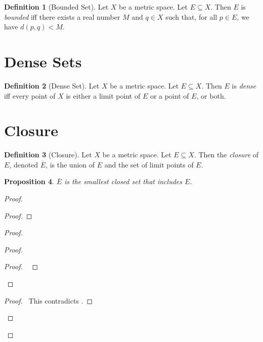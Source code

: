 \documentclass{book}
\let\qed\relax
\newtheorem{prop}{Proposition}[chapter]
\theoremstyle{definition}
\newtheorem{df}[prop]{Definition}
\begin{document}
\begin{df}[Bounded Set]
Let $X$ be a metric space. Let $E \subseteq X$. Then $E$ is \emph{bounded} iff there exists a real number $M$ and $q \in X$ such that, for all $p \in E$, we have $d(p,q) < M$.
\end{df}

\section{Dense Sets}

\begin{df}[Dense Set]
Let $X$ be a metric space. Let $E \subseteq X$. Then $E$ is \emph{dense} iff every point of $X$ is either a limit point of $E$ or a point of $E$, or both.
\end{df}

\section{Closure}

\begin{df}[Closure]
Let $X$ be a metric space. Let $E \subseteq X$. Then the \emph{closure} of $E$, denoted $\overline{E}$, is the union of $E$ and the set of limit points of $E$.
\end{df}

\begin{prop}
$\overline{E}$ is the smallest closed set that includes $E$.
\end{prop}

\begin{proof}
\pf
{}
\begin{proof}
\end{proof}
\begin{proof}
	\begin{proof}
		\begin{proof}
			\pf\ 
		\end{proof}
	\end{proof}
	\qedstep
	\begin{proof}
		\pf\ This contradicts .
	\end{proof}
\end{proof}
\qed
\end{proof}
\end{document}
